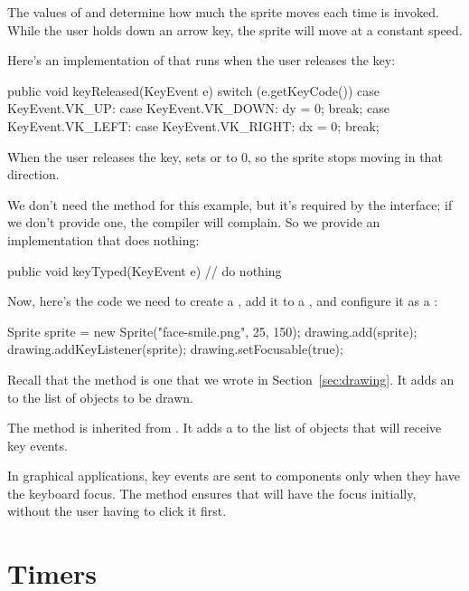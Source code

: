 The values of  and  determine how much the sprite moves each time  is invoked.
While the user holds down an arrow key, the sprite will move at a constant speed.

Here's an implementation of  that runs when the user releases the key:

\begin{code}
public void keyReleased(KeyEvent e) {
    switch (e.getKeyCode()) {
        case KeyEvent.VK_UP:
        case KeyEvent.VK_DOWN:
            dy = 0;
            break;
        case KeyEvent.VK_LEFT:
        case KeyEvent.VK_RIGHT:
            dx = 0;
            break;
    }
}
\end{code}

When the user releases the key,  sets  or  to 0, so the sprite stops moving in that direction.

We don't need the  method for this example, but it's required by the interface; if we don't provide one, the compiler will complain.
So we provide an implementation that does nothing:

\begin{code}
public void keyTyped(KeyEvent e) {
    // do nothing
}
\end{code}

Now, here's the code we need to create a , add it to a , and configure it as a :

\begin{code}
Sprite sprite = new Sprite("face-smile.png", 25, 150);
drawing.add(sprite);
drawing.addKeyListener(sprite);
drawing.setFocusable(true);
\end{code}

Recall that the  method is one that we wrote in Section~\ref{sec:drawing}.
It adds an  to the list of objects to be drawn.

The  method is inherited from .
It adds a  to the list of objects that will receive key events.

In graphical applications, key events are sent to components only when they have the keyboard focus.
The  method ensures that  will have the focus initially, without the user having to click it first.


\section{Timers}

